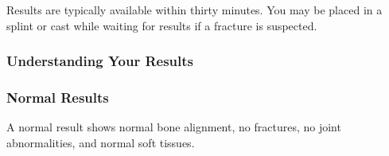 Results are typically available within thirty minutes. You may be placed in a splint or cast while waiting for results if a fracture is suspected.

\subsubsection*{Understanding Your Results}

\subsubsection*{Normal Results}
A normal result shows normal bone alignment, no fractures, no joint abnormalities, and normal soft tissues.
\clearpage

